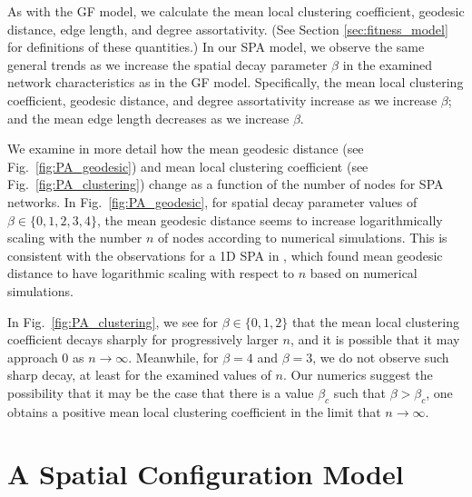 \documentclass[%
 reprint,
 amsmath,amssymb,
 aps,
]{revtex4-1}
\begin{document}
As with the GF model, we calculate the mean local clustering coefficient, geodesic distance, edge length, and degree assortativity. (See Section \ref{sec:fitness_model} for definitions of these quantities.) In our SPA model, we observe the same general trends as we increase the spatial decay parameter $\beta$ in the examined network characteristics as in the GF model. Specifically, the mean local clustering coefficient, geodesic distance, and degree assortativity increase as we increase $\beta$; and the mean edge length decreases as we increase $\beta$.

We examine in more detail how the mean geodesic distance (see Fig.~\ref{fig:PA_geodesic}) and mean local clustering coefficient (see Fig.~\ref{fig:PA_clustering}) change as a function of the number of nodes for SPA networks. 
In Fig.~\ref{fig:PA_geodesic}, for spatial decay parameter values of $\beta \in \{0, 1, 2, 3, 4\}$, the mean geodesic distance seems to increase logarithmically scaling with the number $n$ of nodes according to numerical simulations. This is consistent with the observations for a 1D SPA in \cite{SPA1}, which found {\color{red}mean geodesic distance to have logarithmic scaling with respect to $n$ based on numerical simulations. }


In Fig.~\ref{fig:PA_clustering}, we see for $\beta \in \{0,1,2\}$ that the mean local clustering coefficient decays sharply for progressively larger $n$, and it is possible that it may approach $0$ as $n \rightarrow\infty$.
Meanwhile, for $\beta=4$ and $\beta=3$, we do not observe such sharp decay, at least for the examined values of $n$.
Our numerics suggest the possibility that it may be the case that there is a value $\beta_c$ such that $\beta > \beta_c$, one obtains a positive mean local clustering coefficient in the limit that $n \rightarrow \infty$.




\section{A Spatial Configuration Model} \label{sec:configuration_model}
\end{document}
